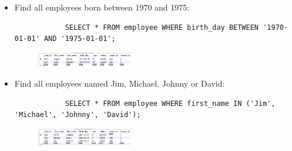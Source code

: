 \begin{itemize}
    \item Find all employees born between 1970 and 1975:
        \begin{verbatim}
            SELECT * FROM employee WHERE birth_day BETWEEN '1970-01-01' AND '1975-01-01';
        \end{verbatim}
        \begin{figure}[H]
            \centering
            \includegraphics[width=0.4\textwidth]{./Figs/2020-12-24-20-51-24.png}
        \end{figure}
    
    \item Find all employees named Jim, Michael, Johnny or David:
        \begin{verbatim}
            SELECT * FROM employee WHERE first_name IN ('Jim', 'Michael', 'Johnny', 'David');
        \end{verbatim}
        \begin{figure}[H]
            \centering
            \includegraphics[width=0.4\textwidth]{./Figs/2020-12-24-20-52-10.png}
        \end{figure}
\end{itemize}

